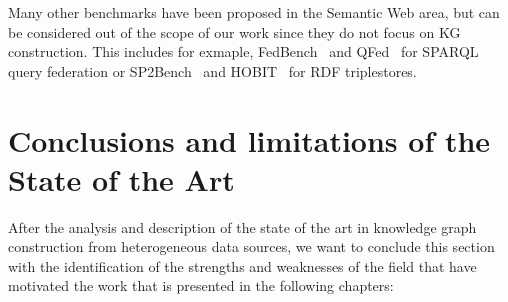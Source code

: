 Many other benchmarks have been proposed in the Semantic Web area, but can be considered out of the scope of our work since they do not focus on KG construction. This includes for exmaple, FedBench~\citep{schmidt2011fedbench} and QFed~\citep{rakhmawati2014qfed} for SPARQL query federation or SP2Bench~\citep{schmidt2009sp} and HOBIT~\citep{roder2020hobbit} for RDF triplestores.

\section{Conclusions and limitations of the State of the Art}
\label{sec:soa_conclusions}
After the analysis and description of the state of the art in knowledge graph construction from heterogeneous data sources, we want to conclude this section with the identification of the strengths and weaknesses of the field that have motivated the work that is presented in the following chapters:
